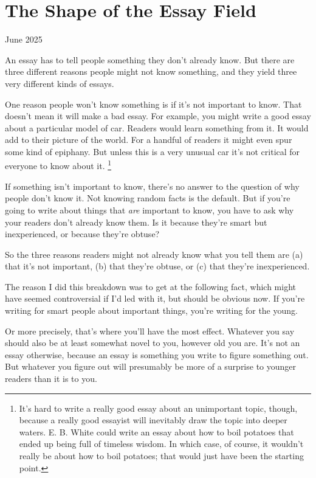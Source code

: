 \documentclass[12pt]{book}
\begin{document}
\chapter{The Shape of the Essay Field}

June 2025

An essay has to tell people something they don't already know. But there
are three different reasons people might not know something, and they
yield three very different kinds of essays.

One reason people won't know something is if it's not important to know.
That doesn't mean it will make a bad essay. For example, you might write
a good essay about a particular model of car. Readers would learn
something from it. It would add to their picture of the world. For a
handful of readers it might even spur some kind of epiphany. But unless
this is a very unusual car it's not critical for everyone to know about
it. \footnote{It's hard to write a really good essay about an unimportant
topic, though, because a really good essayist will inevitably draw the
topic into deeper waters. E. B. White could write an essay about how to
boil potatoes that ended up being full of timeless wisdom. In which
case, of course, it wouldn't really be about how to boil potatoes; that
would just have been the starting point.}

If something isn't important to know, there's no answer to the question
of why people don't know it. Not knowing random facts is the default.
But if you're going to write about things that \emph{are} important to
know, you have to ask why your readers don't already know them. Is it
because they're smart but inexperienced, or because they're obtuse?

So the three reasons readers might not already know what you tell them
are (a) that it's not important, (b) that they're obtuse, or (c) that
they're inexperienced.

The reason I did this breakdown was to get at the following fact, which
might have seemed controversial if I'd led with it, but should be
obvious now. If you're writing for smart people about important things,
you're writing for the young.

Or more precisely, that's where you'll have the most effect. Whatever
you say should also be at least somewhat novel to you, however old you
are. It's not an essay otherwise, because an essay is something you
write to figure something out. But whatever you figure out will
presumably be more of a surprise to younger readers than it is to you.
\end{document}
